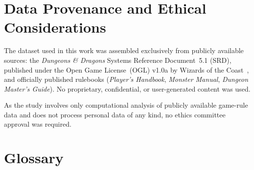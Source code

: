 \documentclass[12pt,a4paper]{article}
\begin{document}
\section*{Data Provenance and Ethical Considerations}

The dataset used in this work was assembled exclusively from publicly
available sources: the \emph{Dungeons \& Dragons} Systems Reference
Document~5.1 (SRD), published under the Open Game License~(OGL)
v1.0a by Wizards of the Coast~\cite{wotc_srd}, and officially
published rulebooks (\emph{Player's Handbook}, \emph{Monster Manual},
\emph{Dungeon Master's Guide}). No proprietary, confidential, or
user-generated content was used.

As the study involves only computational analysis of publicly available
game-rule data and does not process personal data of any kind, no ethics
committee approval was required.

\newpage
\tableofcontents
\newpage
\listoffigures
\listoftables

\newpage
\section*{Glossary}
\end{document}
